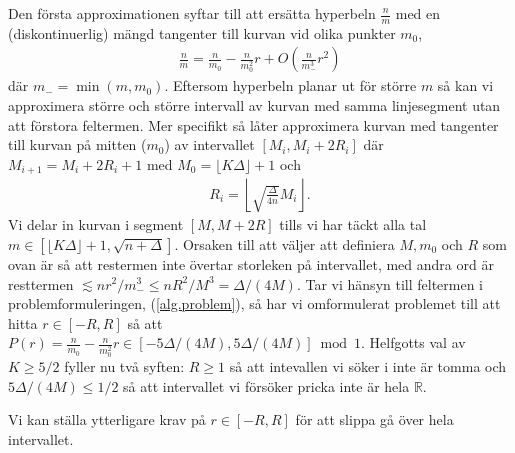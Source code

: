 Den första approximationen syftar till att ersätta hyperbeln \(\frac{n}{m}\) med en (diskontinuerlig) mängd tangenter till kurvan vid olika punkter \(m_0\),
\begin{align*}
    \frac{n}{m} = \frac{n}{m_0} - \frac{n}{m_0^2} r + O\left(\frac{n}{m_-^3} r^2 \right)
\end{align*}
där \(m_- = \min(m, m_0)\). Eftersom hyperbeln planar ut för större $m$ så kan vi approximera större och större intervall av kurvan med samma linjesegment utan att förstora feltermen. Mer specifikt så låter \cite{HaraldSieve} approximera kurvan med tangenter till kurvan på mitten ($m_0$) av intervallet \([M_i, M_i + 2R_i]\) där  $M_{i + 1} = M_i + 2R_i + 1$ med $M_0 = \lfloor K \Delta \rfloor + 1$ och
\begin{align*}
    R_i = \left\lfloor \sqrt{\frac{\Delta}{4n}} M_i \right\rfloor .
\end{align*}
Vi delar in kurvan i segment \([M, M + 2R]\) tills vi har täckt alla tal \(m \in [  \lfloor K \Delta \rfloor + 1, \sqrt{n + \Delta}]\). Orsaken till att \cite{HaraldSieve} väljer att definiera \(M, m_0\) och \(R\) som ovan är så att restermen inte övertar storleken på intervallet, med andra ord är resttermen \(\lesssim nr^2/m_-^3 \leq nR^2/M^3 = \Delta / (4M)\). Tar vi hänsyn till feltermen i problemformuleringen, (\ref{alg.problem}), så har vi omformulerat problemet till att hitta \(r \in [-R, R]\) så att \(P(r) = \frac{n}{m_0} - \frac{n}{m_0^2} r \in [-5\Delta/(4M), 5\Delta/(4M)] \bmod{1}\). Helfgotts val av \(K \geq 5/2\) fyller nu två syften: \(R \geq 1\) så att intevallen vi söker i inte är tomma och \(5\Delta/(4M) \leq 1/2\) så att intervallet vi försöker pricka inte är hela \(\mathbb{R}\).

Vi kan ställa ytterligare krav på \(r \in [-R, R]\) för att slippa gå över hela intervallet. 



